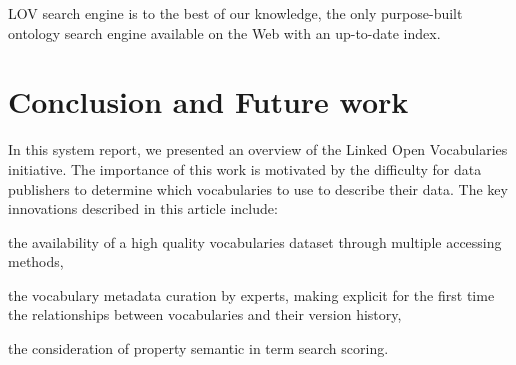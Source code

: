 \documentclass{iosart2c}
\begin{document}
 \begin{table}[!htb]
\end{table}

LOV search engine is to the best of our knowledge, the only purpose-built ontology search engine available on the Web with an up-to-date index.

\section{Conclusion and Future work}
\label{sec:conclusion}
In this system report, we presented an overview of the Linked Open Vocabularies initiative. The importance of this work is motivated by the difficulty for data publishers to determine which vocabularies to use to describe their data. The key innovations described in this article include: 
\begin{inparaenum}[1)] 
	\item the availability of a high quality vocabularies dataset through multiple accessing methods,
	\item the vocabulary metadata curation by experts, making explicit for the first time the relationships between vocabularies and their version history,
	\item the consideration of property semantic in term search scoring.
\end{inparaenum}
\end{document}

